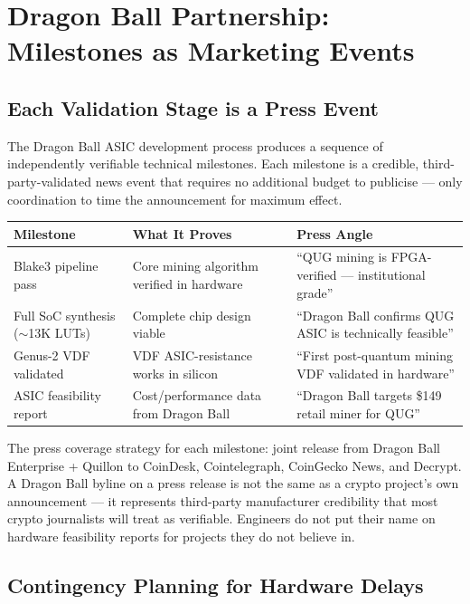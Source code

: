\documentclass[11pt,a4paper]{article}
\begin{document}
\section{Dragon Ball Partnership: Milestones as Marketing Events}

\subsection{Each Validation Stage is a Press Event}

The Dragon Ball ASIC development process produces a sequence of independently verifiable technical milestones. Each milestone is a credible, third-party-validated news event that requires no additional budget to publicise — only coordination to time the announcement for maximum effect.

\begin{center}
\begin{tabular}{L{3cm} L{5.5cm} L{4.5cm}}
  \toprule
  \textbf{Milestone} & \textbf{What It Proves} & \textbf{Press Angle} \\
  \midrule
  Blake3 pipeline pass & Core mining algorithm verified in hardware & ``QUG mining is FPGA-verified — institutional grade'' \\
  Full SoC synthesis ($\sim$13K LUTs) & Complete chip design viable & ``Dragon Ball confirms QUG ASIC is technically feasible'' \\
  Genus-2 VDF validated & VDF ASIC-resistance works in silicon & ``First post-quantum mining VDF validated in hardware'' \\
  ASIC feasibility report & Cost/performance data from Dragon Ball & ``Dragon Ball targets \$149 retail miner for QUG'' \\
  \bottomrule
\end{tabular}
\end{center}

The press coverage strategy for each milestone: joint release from Dragon Ball Enterprise + Quillon to CoinDesk, Cointelegraph, CoinGecko News, and Decrypt. A Dragon Ball byline on a press release is not the same as a crypto project's own announcement — it represents third-party manufacturer credibility that most crypto journalists will treat as verifiable. Engineers do not put their name on hardware feasibility reports for projects they do not believe in.

\subsection{Contingency Planning for Hardware Delays}
\end{document}

